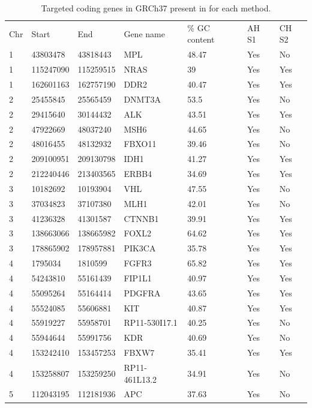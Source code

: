 \documentclass{article}
\begin{document}
\begin{center}
\begin{longtable}{ l l l l l l l}
\caption{Targeted coding genes in GRCh37 present in for each method. \label{long}}\\
%
 \hline  
Chr & Start & End & Gene name & \% GC content & AH S1 & CH S2 \\
1 & 43803478 & 43818443 & MPL & 48.47 & Yes & No \\
1 & 115247090 & 115259515 & NRAS & 39 & Yes & Yes \\
1 & 162601163 & 162757190 & DDR2 & 40.47 & Yes & Yes \\
2 & 25455845 & 25565459 & DNMT3A & 53.5 & Yes & No \\
2 & 29415640 & 30144432 & ALK & 43.51 & Yes & Yes \\
2 & 47922669 & 48037240 & MSH6 & 44.65 & Yes & No \\
2 & 48016455 & 48132932 & FBXO11 & 39.46 & Yes & No \\
2 & 209100951 & 209130798 & IDH1 & 41.27 & Yes & Yes \\
2 & 212240446 & 213403565 & ERBB4 & 34.69 & Yes & Yes \\
3 & 10182692 & 10193904 & VHL & 47.55 & Yes & No \\
3 & 37034823 & 37107380 & MLH1 & 42.01 & Yes & No \\
3 & 41236328 & 41301587 & CTNNB1 & 39.91 & Yes & Yes \\
3 & 138663066 & 138665982 & FOXL2 & 64.62 & Yes & Yes \\
3 & 178865902 & 178957881 & PIK3CA & 35.78 & Yes & Yes \\
4 & 1795034 & 1810599 & FGFR3 & 65.82 & Yes & Yes \\
4 & 54243810 & 55161439 & FIP1L1 & 40.97 & Yes & Yes \\
4 & 55095264 & 55164414 & PDGFRA & 43.65 & Yes & Yes \\
4 & 55524085 & 55606881 & KIT & 40.87 & Yes & Yes \\
4 & 55919227 & 55958701 & RP11-530I17.1 & 40.25 & Yes & No \\
4 & 55944644 & 55991756 & KDR & 40.69 & Yes & No \\
4 & 153242410 & 153457253 & FBXW7 & 35.41 & Yes & Yes \\
4 & 153258807 & 153259250 & RP11-461L13.2 & 34.91 & Yes & No \\
5 & 112043195 & 112181936 & APC & 37.63 & Yes & No \\

\end{longtable}
\end{center}
\end{document}
